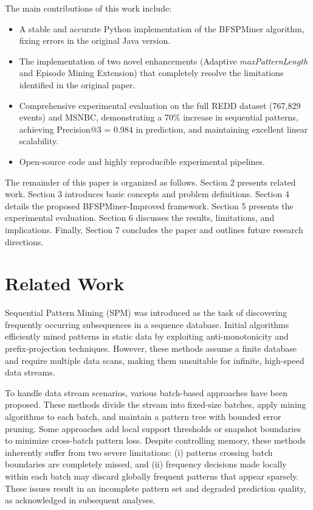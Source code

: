 \documentclass[conference]{IEEEtran}
\begin{document}
The main contributions of this work include:
\begin{itemize}
    \item[(i)] A stable and accurate Python implementation of the BFSPMiner algorithm, fixing errors in the original Java version.
    \item[(ii)] The implementation of two novel enhancements (Adaptive \textit{maxPatternLength} and Episode Mining Extension) that completely resolve the limitations identified in the original paper.
    \item[(iii)] Comprehensive experimental evaluation on the full REDD dataset (767,829 events) and MSNBC, demonstrating a 70\% increase in sequential patterns, achieving Precision@3 = 0.984 in prediction, and maintaining excellent linear scalability.
    \item[(iv)] Open-source code and highly reproducible experimental pipelines.
\end{itemize}

The remainder of this paper is organized as follows. Section 2 presents related work. Section 3 introduces basic concepts and problem definitions. Section 4 details the proposed BFSPMiner-Improved framework. Section 5 presents the experimental evaluation. Section 6 discusses the results, limitations, and implications. Finally, Section 7 concludes the paper and outlines future research directions.

\section{Related Work}
\label{sec:related}

Sequential Pattern Mining (SPM) was introduced as the task of discovering frequently occurring subsequences in a sequence database. Initial algorithms efficiently mined patterns in static data by exploiting anti-monotonicity and prefix-projection techniques. However, these methods assume a finite database and require multiple data scans, making them unsuitable for infinite, high-speed data streams.

To handle data stream scenarios, various batch-based approaches have been proposed. These methods divide the stream into fixed-size batches, apply mining algorithms to each batch, and maintain a pattern tree with bounded error pruning. Some approaches add local support thresholds or snapshot boundaries to minimize cross-batch pattern loss. Despite controlling memory, these methods inherently suffer from two severe limitations: (i) patterns crossing batch boundaries are completely missed, and (ii) frequency decisions made locally within each batch may discard globally frequent patterns that appear sparsely. These issues result in an incomplete pattern set and degraded prediction quality, as acknowledged in subsequent analyses.
\end{document}
